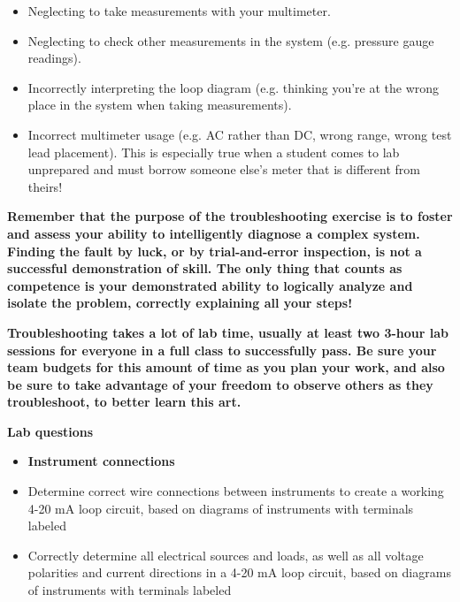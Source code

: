 \documentclass[12pt,a4paper]{article}
\begin{document}
\begin{itemize}
\item{} Neglecting to take measurements with your multimeter.
\item{} Neglecting to check other measurements in the system (e.g. pressure gauge readings).
\item{} Incorrectly interpreting the loop diagram (e.g. thinking you're at the wrong place in the system when taking measurements).
\item{} Incorrect multimeter usage (e.g. AC rather than DC, wrong range, wrong test lead placement).  This is especially true when a student comes to lab unprepared and must borrow someone else's meter that is different from theirs!
\end{itemize}

\vskip 10pt

{\bf Remember that the purpose of the troubleshooting exercise is to foster and assess your ability to intelligently diagnose a complex system.  Finding the fault by luck, or by trial-and-error inspection, is not a successful demonstration of skill.  The only thing that counts as competence is your demonstrated ability to logically analyze and isolate the problem, correctly explaining all your steps!}

\vskip 10pt

{\bf Troubleshooting takes a lot of lab time, usually at least two 3-hour lab sessions for everyone in a full class to successfully pass.  Be sure your team budgets for this amount of time as you plan your work, and also be sure to take advantage of your freedom to observe others as they troubleshoot, to better learn this art.}






\vfil \eject

\noindent
{\bf Lab questions}

\vskip 5pt

\begin{itemize}
\item{} {\bf Instrument connections}
\item{} Determine correct wire connections between instruments to create a working 4-20 mA loop circuit, based on diagrams of instruments with terminals labeled
\item{} Correctly determine all electrical sources and loads, as well as all voltage polarities and current directions in a 4-20 mA loop circuit, based on diagrams of instruments with terminals labeled
\end{itemize}
\end{document}
